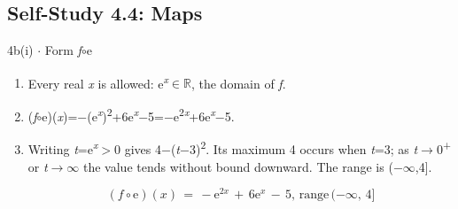 \documentclass[11pt]{article}
\begin{document}
\begin{keepsection}\subsection{Self-Study 4.4: Maps}

\begin{workedbox}{4b(i) \ensuremath{\cdot} Form \textit{f}\ensuremath{\circ}e}
\begin{enumerate}
\item Every real \textit{x} is allowed: e\textsuperscript{\textit{x}}\ensuremath{\in}\ensuremath{\mathbb{R}}, the domain of \textit{f}.
\item (\textit{f}\ensuremath{\circ}e)(\textit{x})=\ensuremath{-}(e\textsuperscript{\textit{x}})\textsuperscript{2}+6e\textsuperscript{\textit{x}}\ensuremath{-}5=\ensuremath{-}e\textsuperscript{2\textit{x}}+6e\textsuperscript{\textit{x}}\ensuremath{-}5.
\item {}
Writing \textit{t}=e\textsuperscript{\textit{x}}\ensuremath{>}0 gives 4\ensuremath{-}(\textit{t}\ensuremath{-}3)\textsuperscript{2}. Its maximum 4 occurs when \textit{t}=3; as \textit{t}\ensuremath{\to}0\textsuperscript{+} or \textit{t}\ensuremath{\to}\ensuremath{\infty} the value tends without bound downward. The range is (\ensuremath{-}\ensuremath{\infty},4].

\begin{equation*}({f}\circ \mathrm{e})({x})\, =\, -\mathrm{e}^{2{x}}\, +\, 6\mathrm{e}^{{x}}\, -\, 5,\, \text{range}\, (-\infty ,\, 4]\end{equation*}
\end{enumerate}
\end{workedbox}

\end{keepsection}
\end{document}
